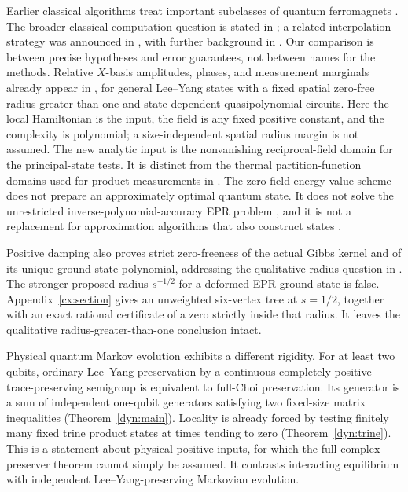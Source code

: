 \documentclass[reqno]{amsart}
\theoremstyle{definition}
\theoremstyle{remark}
\begin{document}
Earlier classical algorithms treat important subclasses of quantum
ferromagnets \cite{BG17,HMS20}. The broader classical computation
question is stated in \cite{BGLW26}; a related interpolation strategy
was announced in \cite{WongTalk23}, with further background in
\cite{WongThesis26}.
Our comparison is between precise hypotheses and error guarantees,
not between names for the methods. Relative \(X\)-basis amplitudes, phases, and
measurement marginals already appear in
\cite[Section~4]{WBG26}, for general Lee--Yang states with a fixed
spatial zero-free radius greater than one and state-dependent
quasipolynomial circuits. Here the local Hamiltonian is the input,
the field is any fixed positive constant, and the complexity is
polynomial; a size-independent spatial radius margin is not assumed.
The new analytic input is the nonvanishing reciprocal-field domain
for the principal-state tests. It is distinct from the thermal
partition-function domains used for product measurements in
\cite[Theorem~15]{YYZ22}.
The zero-field energy-value scheme does not
prepare an approximately optimal quantum state. It does not solve
the unrestricted inverse-polynomial-accuracy EPR problem
\cite{MarwahaSud26}, and it is not a replacement for approximation
algorithms that also construct states \cite{ALMPSS26}.

Positive damping also proves strict zero-freeness of the actual Gibbs
kernel and of its unique ground-state polynomial, addressing the
qualitative radius question in \cite{WBG26}.
The stronger proposed radius $s^{-1/2}$ for a deformed EPR ground
state is false. Appendix~\ref{cx:section} gives an unweighted
six-vertex tree at $s=1/2$, together with an exact rational certificate
of a zero strictly inside that radius. It leaves the qualitative
radius-greater-than-one conclusion intact.

Physical quantum Markov evolution exhibits a different rigidity.
For at least two qubits, ordinary Lee--Yang preservation by a
continuous completely positive trace-preserving semigroup is
equivalent to full-Choi preservation. Its generator is a sum of
independent one-qubit generators satisfying two fixed-size matrix
inequalities (Theorem~\ref{dyn:main}).
Locality is already forced by testing finitely many fixed trine
product states at times tending to zero
(Theorem~\ref{dyn:trine}). This is a statement about physical positive
inputs, for which the full complex preserver theorem cannot simply
be assumed. It contrasts interacting equilibrium with independent
Lee--Yang-preserving Markovian evolution.
\end{document}
